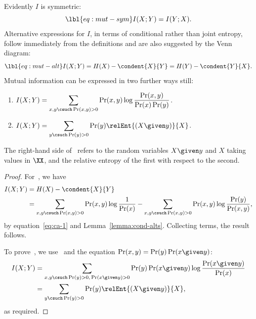 Evidently $I$ is symmetric:
% 
\begin{equation}
\lbl{eq:mut-sym}
I(X; Y) = I(Y; X).
\end{equation}
% 
Alternative expressions for $I$, in terms of conditional rather than joint
entropy, follow immediately from the definitions and are also suggested by
the Venn diagram:
% 
\begin{equation}
\lbl{eq:mut-alt}
I(X; Y) = H(X) - \condent{X}{Y} = H(Y) - \condent{Y}{X}.
\end{equation}
% 
Mutual information can be expressed in two further ways still:

\begin{lemma}
\begin{enumerate}
\item 
{}
$\displaystyle
I(X; Y) = \sum_{x, y \csuch \Pr(x, y) > 0} 
\Pr(x, y) \log \frac{\Pr(x, y)}{\Pr(x) \Pr(y)}$.

\item
{}
$\displaystyle
I(X; Y) = \sum_{y \csuch \Pr(y) > 0} \Pr(y) 
\relEnt{(X \given y)}{X}$.
\end{enumerate}
\end{lemma}

The right-hand side of~ refers to the 
random variables $X \given y$ and $X$ taking values in $\XX$, and the
relative entropy of the first with respect to the second.

\begin{proof}
For~, we have
% 
\begin{align*}
I(X; Y) &
=
H(X) - \condent{X}{Y}   \\
&
=
\sum_{x, y \csuch \Pr(x, y) > 0} \Pr(x, y) \log \frac{1}{\Pr(x)}
-
\sum_{x, y \csuch \Pr(x, y) > 0} \Pr(x, y) \log \frac{\Pr(y)}{\Pr(x, y)},
\end{align*}
% 
by equation~\eqref{eq:ca-1} and
Lemma~\ref{lemma:cond-alts}.  Collecting terms,
the result follows.

To prove~, we use~ and
the equation $\Pr(x, y) = \Pr(y) \Pr(x \given y)$:
% 
\begin{align*}
I(X; Y) &
=
\sum_{x, y \csuch \Pr(y) > 0, \, \Pr(x \given y) > 0}
\Pr(y) \Pr(x \given y) \log\frac{\Pr(x \given y)}{\Pr(x)}       \\
&
=
\sum_{y \csuch \Pr(y) > 0} \Pr(y) 
\relEnt{(X \given y)}{X},
\end{align*}
% 
as required.
\end{proof}

